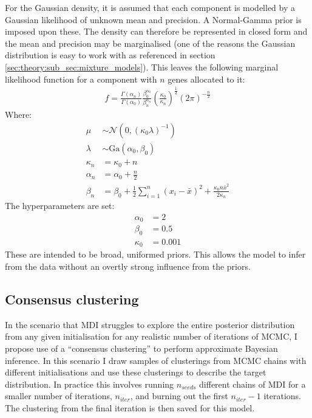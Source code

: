 \documentclass[14pt]{extarticle} %
\begin{document}
	For the Gaussian density, it is assumed that each component is modelled by a Gaussian likelihood of unknown mean and  precision. A Normal-Gamma  prior is imposed upon these. The  density can therefore be represented in closed form and the mean and precision may be marginalised (one of the reasons the Gaussian distribution is easy to work with as referenced in section \ref{sec:theory:sub_sec:mixture_models}). This leaves the following marginal likelihood function for a component with $n$ genes allocated to it:
	\begin{align}
	f = \frac{\Gamma(\alpha_n)}{\Gamma(\alpha_0)} \frac{\beta_0 ^ {\alpha_0}}{\beta_n ^ {\alpha_n}} \left(\frac{\kappa_0}{\kappa_n}\right)^{\frac{1}{2}}\left(2\pi\right)^{-\frac{n}{2}}
	\end{align}
	Where:
	\begin{align}
		\mu &\sim \mathcal{N}(0, (\kappa_0 \lambda)^{-1}) \\
		\lambda &\sim \text{Ga}(\alpha_0, \beta_0) \\
		\kappa_n &= \kappa_0 + n \\
		\alpha_n &= \alpha_0 + \frac{n}{2} \\
		\beta_n &= \beta_0 + \frac{1}{2} \sum_{i=1}^n(x_i - \bar{x})^2 + \frac{\kappa_0 n \bar{x}^2}{2 \kappa_n}
	\end{align}
	The hyperparameters are set:
	\begin{align}
	\alpha_0 &=2 \\
	\beta_0 &= 0.5 \\
	\kappa_0 &= 0.001
	\end{align}
	These are intended to be broad, uniformed priors. This allows the model to infer from the data without an overtly strong influence from the priors.
		
	\subsection{Consensus clustering} \label{sec:consensus_clustering}
	In the scenario that MDI struggles to explore the entire posterior distribution from any given initialisation for any realistic number of iterations of MCMC, I propose use of a ``consensus clustering'' \citep{MontiConsensusClusteringResamplingBased} to perform approximate Bayesian inference. In this scenario I draw samples of clusterings from MCMC chains with different initialisations and use these clusterings to describe the target distribution. In practice this involves running $n_{seeds}$ different chains of MDI for a smaller number of iterations, $n_{iter}$, and burning out the first $n_{iter} - 1$ iterations. The clustering from the final iteration is then saved for this model.
	
\end{document}
